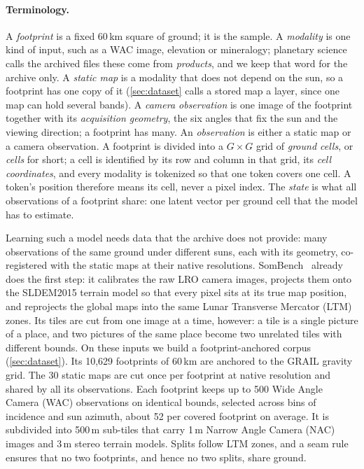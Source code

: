 \paragraph{Terminology.} A \emph{footprint} is a fixed 60\,km square of ground; it is the sample. A \emph{modality} is one kind of input, such as a WAC image, elevation or mineralogy; planetary science calls the archived files these come from \emph{products}, and we keep that word for the archive only. A \emph{static map} is a modality that does not depend on the sun, so a footprint has one copy of it (\cref{sec:dataset} calls a stored map a layer, since one map can hold several bands). A \emph{camera observation} is one image of the footprint together with its \emph{acquisition geometry}, the six angles that fix the sun and the viewing direction; a footprint has many. An \emph{observation} is either a static map or a camera observation. A footprint is divided into a $G\times G$ grid of \emph{ground cells}, or \emph{cells} for short; a cell is identified by its row and column in that grid, its \emph{cell coordinates}, and every modality is tokenized so that one token covers one cell. A token's position therefore means its cell, never a pixel index. The \emph{state} is what all observations of a footprint share: one latent vector per ground cell that the model has to estimate.

Learning such a model needs data that the archive does not provide: many observations of the same ground under different suns, each with its geometry, co-registered with the static maps at their native resolutions. SomBench~\cite{patil2026sombench} already does the first step: it calibrates the raw LRO camera images, projects them onto the SLDEM2015 terrain model so that every pixel sits at its true map position, and reprojects the global maps into the same Lunar Transverse Mercator (LTM) zones. Its tiles are cut from one image at a time, however: a tile is a single picture of a place, and two pictures of the same place become two unrelated tiles with different bounds. On these inputs we build a footprint-anchored corpus (\cref{sec:dataset}). Its 10,629 footprints of 60\,km are anchored to the GRAIL gravity grid. The 30 static maps are cut once per footprint at native resolution and shared by all its observations. Each footprint keeps up to 500 Wide Angle Camera (WAC) observations on identical bounds, selected across bins of incidence and sun azimuth, about 52 per covered footprint on average. It is subdivided into 500\,m sub-tiles that carry 1\,m Narrow Angle Camera (NAC) images and 3\,m stereo terrain models. Splits follow LTM zones, and a seam rule ensures that no two footprints, and hence no two splits, share ground.

